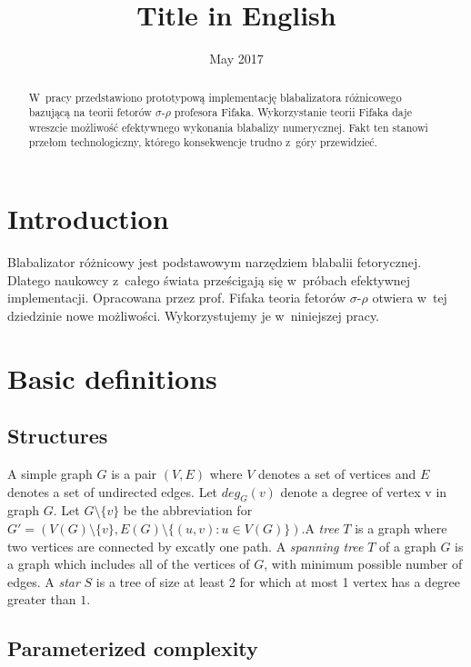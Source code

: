 \documentclass[en]{pracamgr}
\title{Title in English}
\date{May 2017}
\begin{document}
\maketitle

\begin{abstract}
  W~pracy przedstawiono prototypową implementację blabalizatora
  różnicowego bazującą na teorii fetorów $\sigma$-$\rho$ profesora
  Fifaka.  Wykorzystanie teorii Fifaka daje wreszcie możliwość
  efektywnego wykonania blabalizy numerycznej.  Fakt ten stanowi
  przełom technologiczny, którego konsekwencje trudno z~góry
  przewidzieć.
\end{abstract}

\tableofcontents

\chapter*{Introduction}

Blabalizator różnicowy jest podstawowym narzędziem blabalii
fetorycznej.  Dlatego naukowcy z~całego świata prześcigają się
w~próbach efektywnej implementacji.  Opracowana przez prof. Fifaka
teoria fetorów $\sigma$-$\rho$ otwiera w~tej dziedzinie nowe
możliwości.  Wykorzystujemy je w~niniejszej pracy.

\chapter{Basic definitions}\label{r:pojecia}

\section{Structures}

A simple graph $G$ is a pair $(V,E)$ where $V$ denotes a set of vertices
and $E$ denotes a set of undirected edges. Let $deg_G(v)$ denote a degree
of vertex v in graph $G$. Let $G \setminus \{v\}$ be the abbreviation for
$G'=(V(G) \setminus \{v\}, E(G) \setminus \{(u,v): u \in V(G)\})$.A \emph{tree} $T$ is a graph where two
vertices are connected by excatly one path. A \emph{spanning tree} $T$ of a
graph $G$ is a graph which includes all of the vertices of $G$, with minimum
possible number of edges. A \emph{star} $S$ is a tree of size at least 2
for which at most 1 vertex has a degree greater than $1$.


\section{Parameterized complexity}
\end{document}
